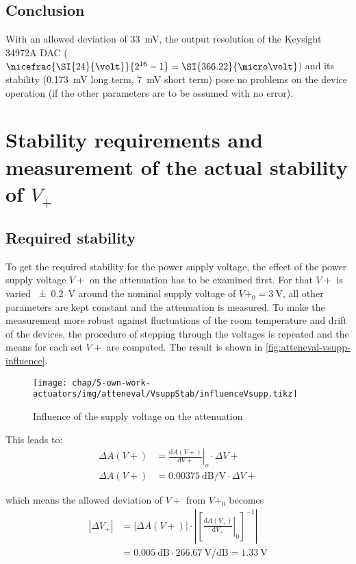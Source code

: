 \subsection{Conclusion}
With an allowed deviation of \SI{33}{\mV}, the output resolution of the Keysight 34972A DAC ($\nicefrac{\SI{24}{\volt}}{2^{16}-1}=\SI{366.22}{\micro\volt}$) and its stability (\SI{0.173}{\mV} long term, \SI{7}{\mV} short term) pose no problems on the device operation (if the other parameters are to be assumed with no error).

\FloatBarrier
\section{Stability requirements and measurement of the actual stability of $V_{+}$}
\subsection{Required stability}
To get the required stability for the power supply voltage, the effect of the power supply voltage $V+$ on the attenuation has to be examined first. For that $V+$ is varied \SI{\pm0.2}{\volt} around the nominal supply voltage of $V+_0=\SI{3}{\volt}$, all other parameters are kept constant and the attenuation is measured. To make the measurement more robust against fluctuations of the room temperature and drift of the devices, the procedure of stepping through the voltages is repeated and the means for each set $V+$ are computed. The result is shown in \autoref{fig:atteneval-vsupp-influence}.

\begin{figure}[tb]
	\centering
	\texttt{[image: chap/5-own-work-actuators/img/atteneval/VsuppStab/influenceVsupp.tikz]}
	\caption{Influence of the supply voltage on the attenuation}
	\label{fig:atteneval-vsupp-influence}
\end{figure}

This leads to:
\begin{align}
\Delta A(V+) &= \left.\frac{\text{d}A(V+)}{\text{d}V+}\right|_{o} \cdot \Delta V+ \\
\Delta A(V+) &= \SI{0.00375}{\dB\per\volt} \cdot \Delta V+
\end{align}

which means the allowed deviation of $V+$ from $V+_0$ becomes
\begin{align}\label{eq:atteneval-stabVsupp}
\left|\Delta V_{+}\right| &= \left|\Delta A(V+)\right| \cdot 
\left|\left[\left.\frac{\text{d}A(V_{+})}{\text{d}V_{+}}\right|_{0}\right]^{-1}\right| \\
 &= \SI{0.005}{\dB} \cdot \SI{266.67}{\volt\per\dB} = \SI{1.33}{\volt}
\end{align}


